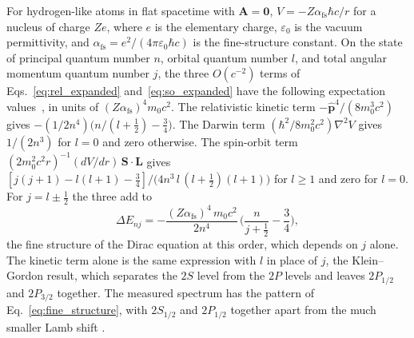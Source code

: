 \documentclass[aps,prd,onecolumn,tightenlines,nofootinbib,notitlepage,11pt,floatfix]{revtex4-2}
\theoremstyle{indentedtheorem}
\begin{document}
For hydrogen-like atoms in flat spacetime with $\mathbf{A}=\mathbf{0}$, $V=-Z\alpha_\text{fs}\hbar c/r$ for a nucleus of charge $Ze$, where $e$ is the elementary charge, $\varepsilon_0$ is the vacuum permittivity, and $\alpha_\text{fs}=e^2/(4\pi\varepsilon_0\hbar c)$ is the fine-structure constant. On the state of principal quantum number $n$, orbital quantum number $l$, and total angular momentum quantum number $j$, the three $O(c^{-2})$ terms of Eqs.~\eqref{eq:rel_expanded} and~\eqref{eq:so_expanded} have the following expectation values~\citep{Sakurai2020Modern}, in units of $(Z\alpha_\text{fs})^4m_0c^2$. The relativistic kinetic term $-\hat{\mathbf{p}}^4/(8m_0^3c^2)$ gives $-(1/2n^4)\big(n/(l+\tfrac{1}{2})-\tfrac{3}{4}\big)$. The Darwin term $(\hbar^2/8m_0^2c^2)\nabla^2V$ gives $1/(2n^3)$ for $l=0$ and zero otherwise. The spin-orbit term $(2m_0^2c^2r)^{-1}(dV/dr)\,\mathbf{S}\cdot\mathbf{L}$ gives $[j(j+1)-l(l+1)-\tfrac{3}{4}]/\big(4n^3 \, l \, (l+\tfrac{1}{2})(l+1)\big)$ for $l\geq1$ and zero for $l=0$. For $j=l\pm\tfrac{1}{2}$ the three add to
\begin{equation}
    \Delta E_{nj} = -\frac{(Z\alpha_\text{fs})^4 \, m_0c^2}{2n^4} \, \Big(\frac{n}{j+\tfrac{1}{2}}-\frac{3}{4}\Big) ,
    \label{eq:fine_structure}
\end{equation}
the fine structure of the Dirac equation at this order, which depends on $j$ alone. The kinetic term alone is the same expression with $l$ in place of $j$, the Klein--Gordon result, which separates the $2S$ level from the $2P$ levels and leaves $2P_{1/2}$ and $2P_{3/2}$ together. The measured spectrum has the pattern of Eq.~\eqref{eq:fine_structure}, with $2S_{1/2}$ and $2P_{1/2}$ together apart from the much smaller Lamb shift \citep{Lamb1947Fine}.
\end{document}
